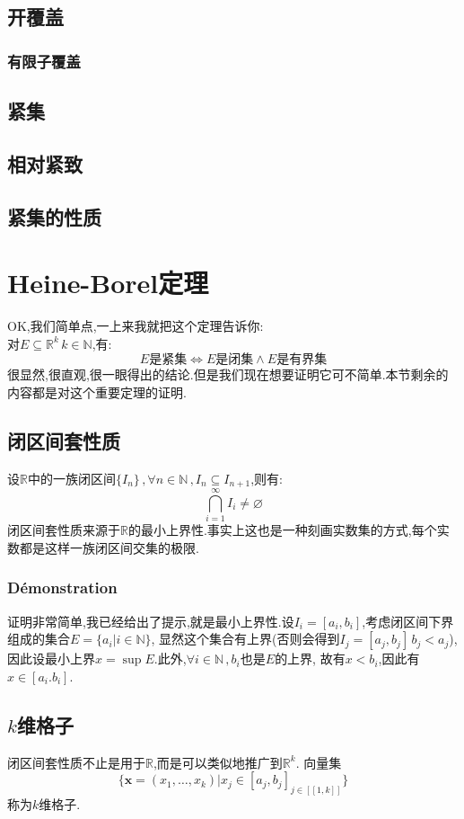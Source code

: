 \documentclass[12pt, a4paper, oneside]{ctexbook}
\newcommand{\R }{\mathbb{R}}%
\begin{document}
  \subsection{开覆盖}
  \subsubsection{有限子覆盖}
  \subsection{紧集}
  \subsection{相对紧致}
  \subsection{紧集的性质}
\section{Heine-Borel定理}
  \noindent
  OK,我们简单点,一上来我就把这个定理告诉你:\\
  对$E\subseteq \R^k\, k\in \mathbb{N}$,有:
  $$
  E\text{是紧集}\Leftrightarrow E\text{是闭集}\land E\text{是有界集}
  $$
  很显然,很直观,很一眼得出的结论.但是我们现在想要证明它可不简单.本节剩余的内容都是对这个重要定理的证明.
  \subsection{闭区间套性质}
  设$\R$中的一族闭区间$\{I_n \}\,, \forall n\in \mathbb{N}\,,I_n\subseteq I_{n+1}$,则有:
  $$
    \bigcap_{i=1}^\infty I_i\neq \varnothing
  $$
  闭区间套性质来源于$\R$的最小上界性.事实上这也是一种刻画实数集的方式,每个实数都是这样一族闭区间交集的极限.
  \subsubsection{Démonstration}
  证明非常简单,我已经给出了提示,就是最小上界性.设$I_i=[a_i,b_i]$,考虑闭区间下界组成的集合$E=\{a_i|i\in \mathbb{N}\}$,
  显然这个集合有上界(否则会得到$I_j=[a_j,b_j]\,b_j<a_j$),因此设最小上界$x=\sup E$.此外,$\forall i\in \mathbb{N}\,,b_i$也是$E$的上界,
  故有$x<b_i$,因此有$x\in[a_i.b_i]$.
  \subsection{$k$维格子}
  闭区间套性质不止是用于$\R$,而是可以类似地推广到$\R^k$.
  向量集
  $$\{\textbf{x}=(x_1,\dots,x_k)|x_j\in[a_j,b_j]_{j\in[\![1,k]\!]} \} $$
  称为$k$维格子.
\end{document}
